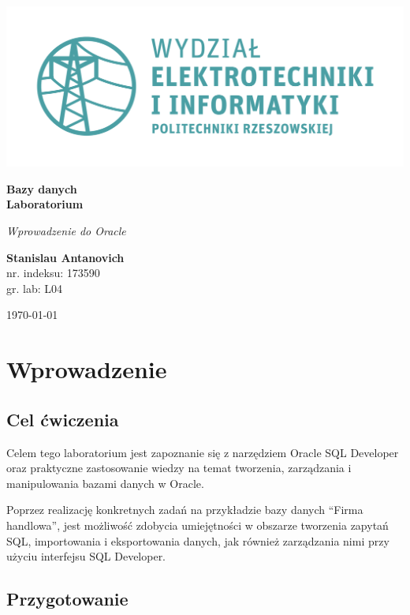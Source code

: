 \documentclass[a4paper, 10pt]{article}
\begin{document}
\begin{titlepage}
\begin{center}
	\includegraphics[scale=0.7]{logo.png}

	\vspace*{4cm}
	\textbf{Bazy danych\\ Laboratorium}

	\vspace{1.5cm}
	\textit{Wprowadzenie do Oracle}

	\vspace{1.5cm}
	\textbf{Stanislau Antanovich}\\
	nr. indeksu: 173590\\
	gr. lab: L04

	\vspace{4.5cm}
	\today
\end{center}
\end{titlepage}

\tableofcontents
\listoffigures
\lstlistoflistings

\newpage

\section{Wprowadzenie}
\subsection{Cel ćwiczenia}

Celem tego laboratorium jest zapoznanie się z narzędziem Oracle SQL Developer oraz praktyczne zastosowanie wiedzy na temat tworzenia, zarządzania i manipulowania bazami danych w Oracle. 

Poprzez realizację konkretnych zadań na przykładzie bazy danych ``Firma handlowa'', jest możliwość zdobycia umiejętności w obszarze tworzenia zapytań SQL, importowania i eksportowania danych, jak również zarządzania nimi przy użyciu interfejsu SQL Developer.

\subsection{Przygotowanie}
\end{document}
